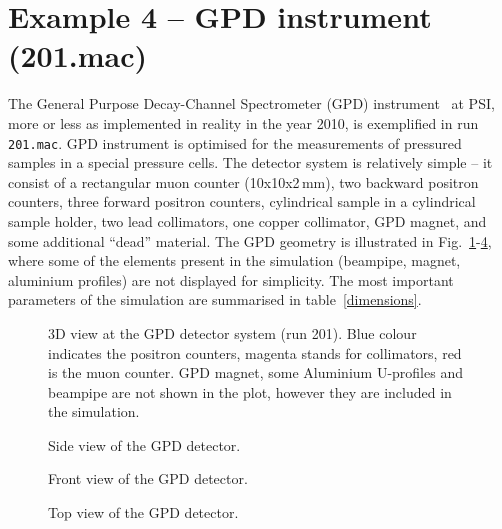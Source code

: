 \documentclass[twoside]{dis04}
\begin{document}
\section{Example 4 -- GPD instrument (201.mac)}
%
The General Purpose Decay-Channel Spectrometer (GPD) 
instrument~\cite{GPD} at PSI, more or less as implemented in reality in the year 2010, is exemplified in
run {\tt 201.mac}.  GPD instrument is optimised for the measurements of pressured samples 
in a special pressure cells.
The detector system is relatively simple -- it consist of a rectangular muon counter (10x10x2\,mm),
two backward positron counters, three forward positron counters, cylindrical sample in a cylindrical
sample holder, two lead collimators, one copper collimator, GPD magnet, and some additional ``dead'' material.
The GPD geometry is illustrated in Fig.~\ref{fig:vis_201_1}-\ref{fig:vis_201_4},
where some of the elements present in the simulation (beampipe, magnet, aluminium profiles) are not displayed
for simplicity.
The most important parameters of the simulation are summarised in table~\ref{dimensions}.
%
\begin{figure}[tbp]\centering
{}
\caption{3D view at the GPD detector system (run 201). Blue colour indicates the positron counters,
magenta stands for collimators, red is the muon counter. GPD magnet, some Aluminium U-profiles and beampipe 
are not shown in the plot, however they are included in the simulation.}
\label{fig:vis_201_1}
\end{figure}
%
%
\begin{figure}[tbp]\centering
{}
\caption{Side view of the GPD detector.}
\label{fig:vis_201_2}
\end{figure}
%
%
\begin{figure}[tbp]\centering
{}
\caption{Front view of the GPD detector.}
\label{fig:vis_201_3}
\end{figure}
%
%
\begin{figure}[tbp]\centering
{}
\caption{Top view of the GPD detector.}
\label{fig:vis_201_4}
\end{figure}
%
\end{document}
